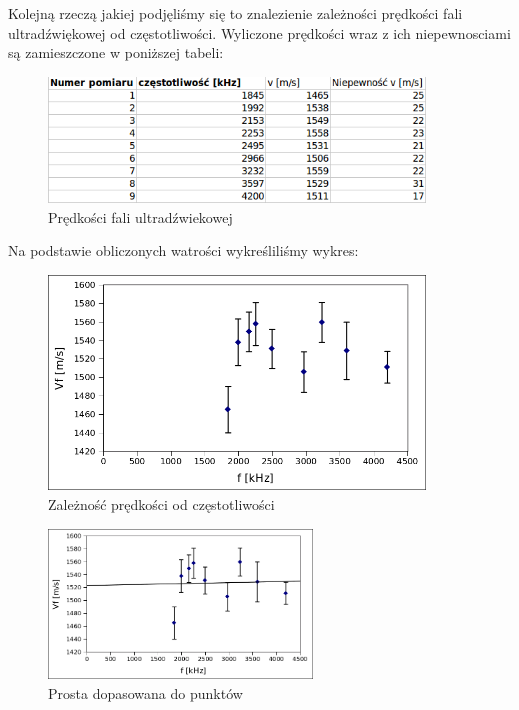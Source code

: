 \documentclass[a4paper,12pt]{article}
\begin{document}
Kolejną rzeczą jakiej podjęliśmy się to znalezienie zależności prędkości fali ultradźwiękowej od częstotliwości. Wyliczone prędkości wraz z ich niepewnosciami są zamieszczone w poniższej tabeli: 

\begin{figure} [H]
  \begin{center}
    \includegraphics[width = 10cm]{tab7.png}
    \caption{Prędkości fali ultradźwiekowej}
  \end{center}
\end{figure}

Na podstawie obliczonych watrości wykreśliliśmy wykres: 

\begin{figure} [H]
  \begin{center}
    \includegraphics[width = 10cm]{wykres3.png}
    \caption{Zależność prędkości od częstotliwości}
  \end{center}
\end{figure}


\begin{figure} [H]
  \begin{center}
    \includegraphics[width = 7cm]{wykres4.png}
    \caption{Prosta dopasowana do punktów}
  \end{center}
\end{figure}
\end{document}
